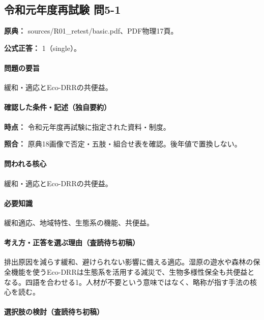 \subsection{令和元年度再試験 問5-1}
\label{q:r01-ret-basic-5-1}

\noindent\textbf{原典：} sources/R01\_retest/basic.pdf、PDF物理17頁。

\textbf{公式正答：} 1（single）。

\paragraph{問題の要旨} 緩和・適応とEco-DRRの共便益。

\paragraph{確認した条件・記述（独自要約）}\mbox{}\par

\noindent\textbf{時点：} 令和元年度再試験に指定された資料・制度。\par

\noindent\textbf{照合：} 原典18画像で否定・五肢・組合せ表を確認。後年値で置換しない。\par

\paragraph{問われる核心} 緩和・適応とEco-DRRの共便益。

\paragraph{必要知識} 緩和適応、地域特性、生態系の機能、共便益。

\paragraph{考え方・正答を選ぶ理由（査読待ち初稿）} 排出原因を減らす緩和、避けられない影響に備える適応。湿原の遊水や森林の保全機能を使うEco-DRRは生態系を活用する減災で、生物多様性保全も共便益となる。四語を合わせる1。人材が不要という意味ではなく、略称が指す手法の核心を読む。

\paragraph{選択肢の検討（査読待ち初稿）}\mbox{}\par

